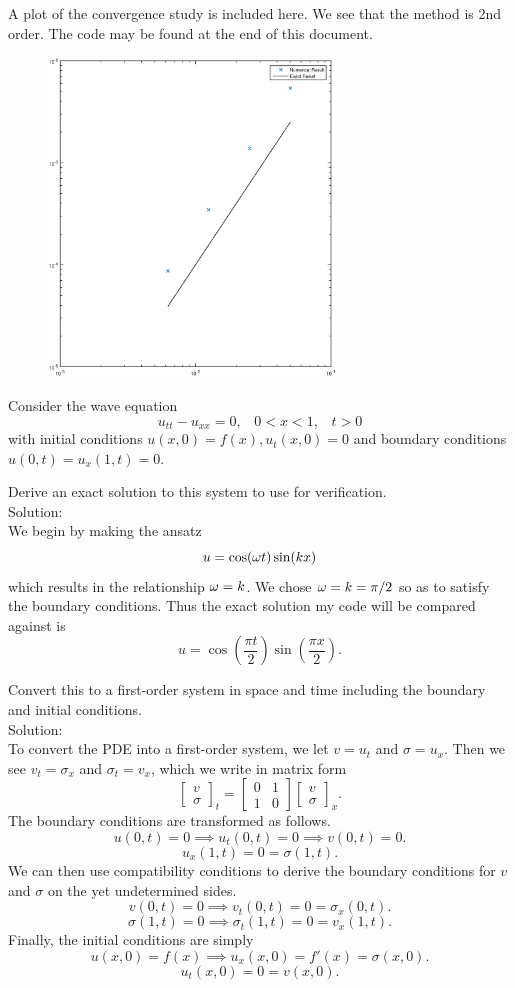 A plot of the convergence study is included here. We see that the method is 2nd order. The code may be found at the end of this document.
\begin{figure}[h]
\centering
\includegraphics[width=3in]{nonConstConv}
\end{figure}


\eenum

\item Consider the wave equation
$$u_{tt}-u_{xx}=0,\;\;\;0<x<1,\;\;\;t>0$$
with initial conditions $u(x,0)=f(x), u_t(x,0)=0$ and boundary conditions $u(0,t)=u_x(1,t)=0.$
\benum
\item  Derive an exact solution to this system to use for verification.\\
Solution:\\
We begin by making the ansatz
$$u=\cos(\omega t)\sin (kx)$$
which results in the relationship $\omega=k$. We chose $\omega=k=\pi/2$ so as to satisfy the boundary conditions. Thus the exact solution my code will be compared against is
$$u=\cos\left(\frac{\pi t}{2}\right)\sin\left(\frac{\pi x}{2}\right).$$

\item Convert this to a first-order system in space and time including the boundary and initial conditions.\\
Solution:\\
To convert the PDE into a first-order system, we let $v=u_t$ and $\sigma=u_x.$ Then we see $v_t=\sigma_x$ and $\sigma_t=v_x$, which we write in matrix form
$$\left[\begin{array}{c}v\\ \sigma\end{array}\right]_t=\left[\begin{array}{cc}0&1\\1&0\end{array}\right]\left[\begin{array}{c}v\\ \sigma\end{array}\right]_x.$$
The boundary conditions are transformed as follows.
$$u(0,t)=0\implies u_t(0,t)=0\implies v(0,t)=0.$$
$$u_x(1,t)=0=\sigma(1,t).$$
We can then use compatibility conditions to derive the boundary conditions for $v$ and $\sigma$ on the yet undetermined sides.
$$v(0,t)=0\implies v_t(0,t)=0=\sigma_x(0,t).$$
$$\sigma(1,t)=0\implies\sigma_t(1,t)=0=v_x(1,t).$$
Finally, the initial conditions are simply
$$u(x,0)=f(x)\implies u_x(x,0)=f'(x)=\sigma(x,0).$$
$$u_t(x,0)=0=v(x,0).$$


